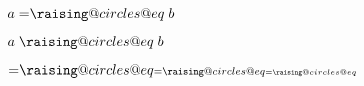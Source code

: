\documentclass{article}
\makeatletter
\newcommand{\raisingcircleseq}{\mathrel{\mathpalette\raising@circles@eq\relax}}
\newcommand{\raising@circles@eq}[2]{%
  \vphantom{#1+}%
  \vbox{
    \settowidth\unitlength{$#1\mspace{2mu}$}%
    \offinterlineskip\m@th
    \ialign{##\cr
      \hfil\small@circle{#1}$#1\mspace{1.5mu}$\cr\noalign{\vskip0.5\unitlength}
      $#1=$\cr\noalign{\post@vskip{+}{#1}}
      $#1\mspace{1.5mu}$\small@circle{#1}\hfill\cr\noalign{\post@vskip{-}{#1}}
    }%
  }%
}
\newcommand{\small@circle}[1]{%
  \smash{%
    \begin{picture}(1,1)
    \small@linethickness{#1}
    \put(0.5,0.5){\circle{1}}
    \end{picture}%
  }%
}
\newcommand{\small@linethickness}[1]{%
  \linethickness{%
      \ifx#1\displaystyle 0.8\fontdimen8\textfont3\else
      \ifx#1\textstyle 0.8\fontdimen8\textfont3\else
      \ifx#1\scriptstyle0.8\fontdimen8\scriptfont3\else
      1\fontdimen8\scriptscriptfont3\fi\fi\fi
  }%
}
\newcommand{\post@vskip}[2]{%
  \expandafter\vskip\expanded{%
    #1\ifx#2\scriptscriptstyle0.9\else\ifx#2\scriptstyle0.6\else0.3\fi\fi\unitlength
  }%
}
\makeatother
\begin{document}
$a=\raisingcircleseq b$

$a\raisingcircleseq b$

${=\raisingcircleseq}{\scriptstyle=\raisingcircleseq}{\scriptscriptstyle=\raisingcircleseq}$
\end{document}
